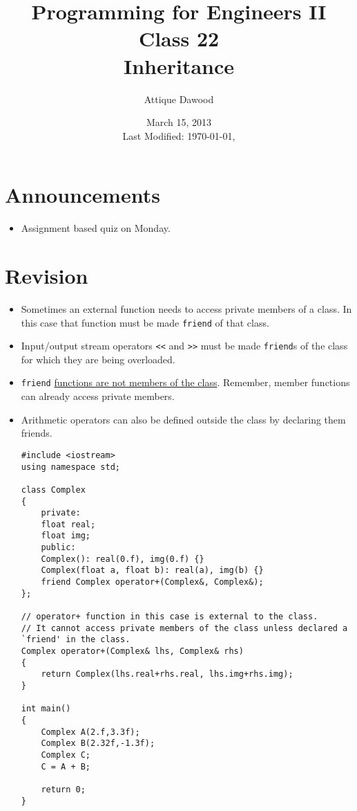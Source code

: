 \documentclass[12pt,a4paper]{article}
\title{\vspace{-2cm}Programming for Engineers II\\Class 22\\Inheritance}
\author{Attique Dawood}
\date{March 15, 2013\\[0.2cm] Last Modified: \today, \currenttime}
\begin{document}
\maketitle
\section{Announcements}
\begin{itemize}
\item Assignment based quiz on Monday.
\end{itemize}
\section{Revision}
\begin{itemize}
\item Sometimes an external function needs to access private members of a class. In this case that function must be made \verb|friend| of that class.
\item Input/output stream operators \verb|<<| and \verb|>>| must be made \verb|friend|s of the class for which they are being overloaded.
\item \verb|friend| \underline{functions are not members of the class}. Remember, member functions can already access private members.
\item Arithmetic operators can also be defined outside the class by declaring them friends.
\begin{lstlisting}[caption={operator+ implemented as \texttt{friend}}]
#include <iostream>
using namespace std;

class Complex
{
	private:
	float real;
	float img;
	public:
	Complex(): real(0.f), img(0.f) {}
	Complex(float a, float b): real(a), img(b) {}
	friend Complex operator+(Complex&, Complex&);
};

// operator+ function in this case is external to the class.
// It cannot access private members of the class unless declared a `friend' in the class.
Complex operator+(Complex& lhs, Complex& rhs)
{
	return Complex(lhs.real+rhs.real, lhs.img+rhs.img);
}

int main()
{
	Complex A(2.f,3.3f);
	Complex B(2.32f,-1.3f);
	Complex C;
	C = A + B;

	return 0;
}
\end{lstlisting}
\end{itemize}
\end{document}
